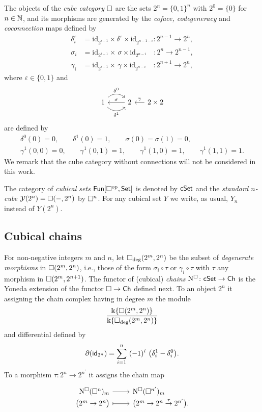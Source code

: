 The objects of the \textit{cube category} $\square$ are the sets $2^n = \{0, 1\}^n$ with $2^0 = \{0\}$ for $n \in \mathbb{N}$, and its morphisms are generated by the \textit{coface, codegeneracy} and \textit{coconnection} maps defined by
\begin{align*}
\delta_i^\varepsilon & =
\mathrm{id}_{2^{i-1}} \times \delta^\varepsilon \times \mathrm{id}_{2^{n-1-i}} \colon 2^{n-1} \to 2^n, \\
\sigma_i & =
\mathrm{id}_{2^{i-1}} \times \, \sigma \times \mathrm{id}_{2^{n-i}} \quad \colon 2^{n} \to 2^{n-1}, \\
\gamma_i & =
\mathrm{id}_{2^{i-1}} \times \, \gamma \times \mathrm{id}_{2^{n-i}} \quad \colon 2^{n+1} \to 2^{n},
\end{align*}
where $\varepsilon \in \{0,1\}$ and
\[
\begin{tikzcd}
1 \arrow[r, out=45, in=135, "\delta^0"] \arrow[r, out=-45, in=-135, "\delta^1"'] & 2 \arrow[l, "\sigma"'] &[-10pt] \arrow[l, "\gamma"'] 2 \times 2
\end{tikzcd}
\]
are defined by
\begin{gather*}
\delta^0(0) = 0, \qquad
\delta^1(0) = 1, \qquad
\sigma(0) = \sigma(1) = 0, \qquad \\
\gamma^1(0,0) = 0, \qquad
\gamma^1(0,1) = 1, \qquad
\gamma^1(1,0) = 1, \qquad
\gamma^1(1,1) = 1.
\end{gather*}
We remark that the cube category without connections will not be considered in this work.

The category of \textit{cubical sets} $\mathsf{Fun}[\square^{\mathrm{op}}, \mathsf{Set}]$ is denoted by $\mathsf{cSet}$ and
the \textit{standard $n$-cube} $\operatorname{\mathcal{Y}}(2^n) = \square(-, 2^n)$ by $\square^n$.
For any cubical set $Y$ we write, as usual, $Y_n$ instead of $Y(2^n)$.

\subsection{Cubical chains}

For non-negative integers $m$ and $n$, let $\square_{\deg}(2^m, 2^n)$ be the subset of \textit{degenerate morphisms} in $\square(2^m, 2^n)$, i.e., those of the form $\sigma_i \circ \tau$ or $\gamma_i \circ \tau$ with $\tau$ any morphism in $\square(2^m, 2^{n+1})$.
The functor of (cubical) \textit{chains} $\operatorname{N^{\square}} \colon \mathsf{cSet} \to \mathsf{Ch}$ is the Yoneda extension of the functor $\square \to \mathsf{Ch}$ defined next.
To an object $2^n$ it assigning the chain complex having in degree $m$ the module
\[
\frac{\Bbbk\{\square(2^m, 2^n)\}}{\Bbbk\{\square_{\deg}(2^m, 2^n)\}}
\]
and differential defined by
\[
\partial (\id_{2^n}) = \sum_{i=1}^{n} \ (-1)^i \
\big(\delta_i^1 - \delta_i^0 \big).
\]
To a morphism $\tau \colon 2^n \to 2^{n^\prime}$ it assigns the chain map
\[
\begin{tikzcd}[row sep=-3pt, column sep=normal,
/tikz/column 1/.append style={anchor=base east},
/tikz/column 2/.append style={anchor=base west}]
\cchains(\cube^n)_m \arrow[r] & \cchains(\cube^{n^\prime})_m \\
\big( 2^m \to 2^n \big) \arrow[r, mapsto] & \big( 2^m \to 2^n \stackrel{\tau}{\to} 2^{n^\prime} \big).
\end{tikzcd}
\]

